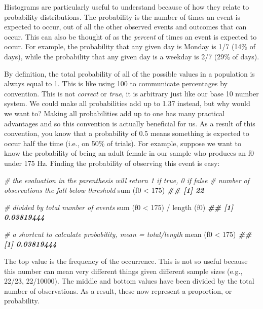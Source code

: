 \documentclass[
]{book}
\newenvironment{Shaded}{\begin{snugshade}}{\end{snugshade}}
\newcommand{\CommentTok}[1]{\textcolor[rgb]{0.56,0.35,0.01}{\textit{#1}}}
\newcommand{\DecValTok}[1]{\textcolor[rgb]{0.00,0.00,0.81}{#1}}
\newcommand{\DocumentationTok}[1]{\textcolor[rgb]{0.56,0.35,0.01}{\textbf{\textit{#1}}}}
\newcommand{\FunctionTok}[1]{\textcolor[rgb]{0.00,0.00,0.00}{#1}}
\newcommand{\NormalTok}[1]{#1}
\newcommand{\SpecialCharTok}[1]{\textcolor[rgb]{0.00,0.00,0.00}{#1}}
\begin{document}
Histograms are particularly useful to understand because of how they relate to probability distributions. The probability is the number of times an event is expected to occur, out of all the other observed events and outcomes that can occur. This can also be thought of as the \emph{percent} of times an event is expected to occur. For example, the probability that any given day is Monday is 1/7 (14\% of days), while the probability that any given day is a weekday is 2/7 (29\% of days).

By definition, the total probability of all of the possible values in a population is always equal to 1. This is like using 100 to communicate percentages by convention. This is not \emph{correct} or \emph{true}, it is arbitrary just like our base 10 number system. We could make all probabilities add up to 1.37 instead, but why would we want to? Making all probabilities add up to one has many practical advantages and so this convention is actually beneficial for us. As a result of this convention, you know that a probability of 0.5 means something is expected to occur half the time (i.e., on 50\% of trials). For example, suppose we want to know the probability of being an adult female in our sample who produces an f0 under 175 Hz. Finding the probability of observing this event is easy:

\begin{Shaded}
\begin{Highlighting}[]
\CommentTok{\# the evaluation in the parenthesis will return 1 if true, 0 if false}
\CommentTok{\# number of observations the fall below threshold}
\FunctionTok{sum}\NormalTok{ (f0 }\SpecialCharTok{\textless{}} \DecValTok{175}\NormalTok{)  }
\DocumentationTok{\#\# [1] 22}

\CommentTok{\# divided by total number of events}
\FunctionTok{sum}\NormalTok{ (f0 }\SpecialCharTok{\textless{}} \DecValTok{175}\NormalTok{) }\SpecialCharTok{/} \FunctionTok{length}\NormalTok{ (f0)  }
\DocumentationTok{\#\# [1] 0.03819444}

\CommentTok{\# a shortcut to calculate probability, mean = total/length}
\FunctionTok{mean}\NormalTok{ (f0 }\SpecialCharTok{\textless{}} \DecValTok{175}\NormalTok{)}
\DocumentationTok{\#\# [1] 0.03819444}
\end{Highlighting}
\end{Shaded}

The top value is the frequency of the occurrence. This is not so useful because this number can mean very different things given different sample sizes (e.g., 22/23, 22/10000). The middle and bottom values have been divided by the total number of observations. As a result, these now represent a proportion, or probability.
\end{document}

